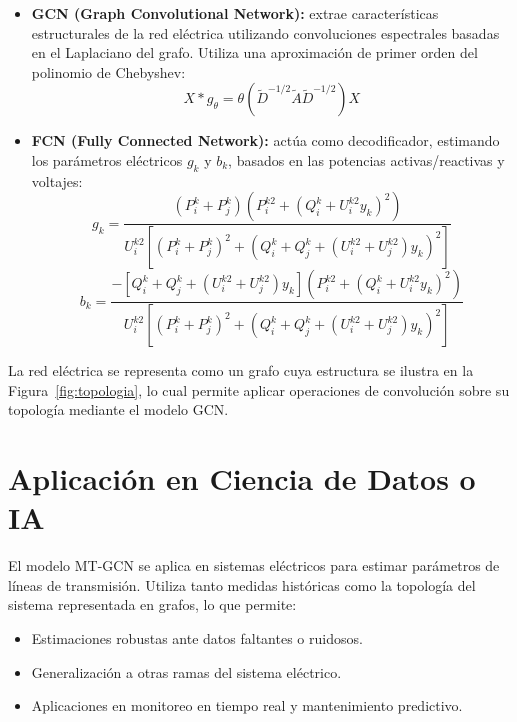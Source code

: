 \documentclass[11pt]{article}
\begin{document}
\begin{itemize}
    \item \textbf{GCN (Graph Convolutional Network):} extrae características estructurales de la red eléctrica utilizando convoluciones espectrales basadas en el Laplaciano del grafo. Utiliza una aproximación de primer orden del polinomio de Chebyshev:
    \[
    X * g_\theta = \theta(\tilde{D}^{-1/2} \tilde{A} \tilde{D}^{-1/2})X
    \]

    \item \textbf{FCN (Fully Connected Network):} actúa como decodificador, estimando los parámetros eléctricos $g_k$ y $b_k$, basados en las potencias activas/reactivas y voltajes:
    \[
    g_k = \frac{(P_i^k + P_j^k)(P_i^{k2} + (Q_i^k + U_i^{k2} y_k)^2)}{U_i^{k2}[(P_i^k + P_j^k)^2 + (Q_i^k + Q_j^k + (U_i^{k2} + U_j^{k2})y_k)^2]}
    \]
    \[
    b_k = \frac{-\left[Q_i^k + Q_j^k + (U_i^{k2} + U_j^{k2})y_k\right](P_i^{k2} + (Q_i^k + U_i^{k2} y_k)^2)}{U_i^{k2}[(P_i^k + P_j^k)^2 + (Q_i^k + Q_j^k + (U_i^{k2} + U_j^{k2})y_k)^2]}
    \]
\end{itemize}



\vspace{1em}  %

La red eléctrica se representa como un grafo cuya estructura se ilustra en la Figura~\ref{fig:topologia}, lo cual permite aplicar operaciones de convolución sobre su topología mediante el modelo GCN.

\clearpage  %

\section{Aplicación en Ciencia de Datos o IA}
El modelo MT-GCN se aplica en sistemas eléctricos para estimar parámetros de líneas de transmisión. Utiliza tanto medidas históricas como la topología del sistema representada en grafos, lo que permite:
\begin{itemize}
    \item Estimaciones robustas ante datos faltantes o ruidosos.
    \item Generalización a otras ramas del sistema eléctrico.
    \item Aplicaciones en monitoreo en tiempo real y mantenimiento predictivo.
\end{itemize}
\end{document}
